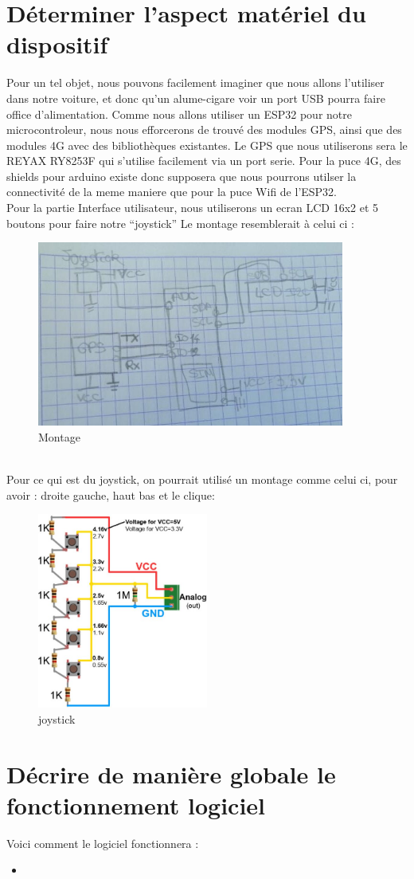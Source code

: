 \documentclass[10pt,a4paper]{article}
\newcommand{\insertcode}[2]{\begin{itemize}\item[]\end{itemize}}
\begin{document}
\section{Déterminer l'aspect matériel du dispositif}
 
 Pour un tel objet, nous pouvons facilement imaginer que nous allons l'utiliser dans notre voiture, et donc qu'un alume-cigare voir un port USB pourra faire office d'alimentation. 
 Comme nous allons utiliser un ESP32 pour notre microcontroleur, nous nous efforcerons de trouvé des modules GPS, ainsi que des modules 4G avec des bibliothèques existantes.
 Le GPS que nous utiliserons sera le REYAX RY8253F qui s'utilise facilement via un port serie. 
 Pour la puce 4G, des shields pour arduino existe donc supposera que nous pourrons utilser la connectivité de la meme maniere que pour la puce Wifi de l'ESP32.\\
 Pour la partie Interface utilisateur, nous utiliserons un ecran LCD 16x2 et 5 boutons pour faire notre ``joystick''
 Le montage resemblerait à celui ci :\\
 \begin{figure}[h!]
\centering
\includegraphics[width=0.9\textwidth]{2.jpg}
\caption{Montage}
\label{fig:universe}
\end{figure}\\
Pour ce qui est du joystick, on pourrait utilisé un montage comme celui ci, pour avoir : droite gauche, haut bas et le clique:\\
\begin{figure}[h!]
\centering
\includegraphics[width=0.5\textwidth]{3.jpg}
\caption{joystick}
\label{fig:universe}
\end{figure}
 \newpage

\section{Décrire de manière globale le fonctionnement logiciel}
 Voici comment le logiciel fonctionnera :
 
 \insertcode{code/pseudocode}{pseudocode}
 
 
 
 
\end{document}
